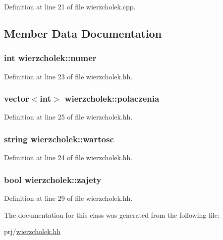 \-Definition at line 21 of file wierzcholek.\-cpp.



\subsection{\-Member \-Data \-Documentation}
\hypertarget{classwierzcholek_a66aaea6b1187250f7100542adc1617d2}{
\subsubsection[{numer}]{\setlength{\rightskip}{0pt plus 5cm}int {\bf wierzcholek\-::numer}}}\label{classwierzcholek_a66aaea6b1187250f7100542adc1617d2}


\-Definition at line 23 of file wierzcholek.\-hh.

\hypertarget{classwierzcholek_a30b8190b35ec29e5cc13910ce56e59e9}{
\subsubsection[{polaczenia}]{\setlength{\rightskip}{0pt plus 5cm}vector$<$int$>$ {\bf wierzcholek\-::polaczenia}}}\label{classwierzcholek_a30b8190b35ec29e5cc13910ce56e59e9}


\-Definition at line 25 of file wierzcholek.\-hh.

\hypertarget{classwierzcholek_a19aa16bf7e01a987fcc360e5da902209}{
\subsubsection[{wartosc}]{\setlength{\rightskip}{0pt plus 5cm}string {\bf wierzcholek\-::wartosc}}}\label{classwierzcholek_a19aa16bf7e01a987fcc360e5da902209}


\-Definition at line 24 of file wierzcholek.\-hh.

\hypertarget{classwierzcholek_ad67644b5f408397f28d7150d3bac76d2}{
\subsubsection[{zajety}]{\setlength{\rightskip}{0pt plus 5cm}bool {\bf wierzcholek\-::zajety}}}\label{classwierzcholek_ad67644b5f408397f28d7150d3bac76d2}


\-Definition at line 29 of file wierzcholek.\-hh.



\-The documentation for this class was generated from the following file\-:\begin{DoxyCompactItemize}
\item 
prj/\hyperlink{wierzcholek_8hh}{wierzcholek.\-hh}\end{DoxyCompactItemize}
